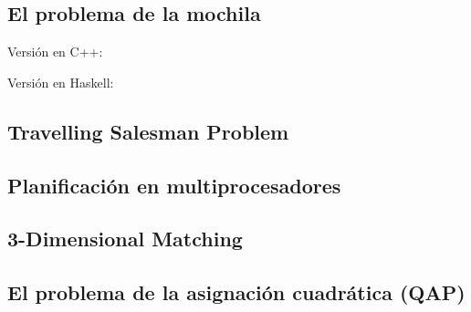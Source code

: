\documentclass[a4paper, 11pt]{article} %
\begin{document}
  \subsection{El problema de la mochila}
        Versión en C++:
        
        \small
  	\texttt{}
        \normalsize
        
        Versión en Haskell:
        
        \small
  	\texttt{}
        \normalsize
        
  \subsection{Travelling Salesman Problem}
        \small
  	\texttt{}
        \normalsize
  \subsection{Planificación en multiprocesadores}
        \small
  	\texttt{}
        \normalsize
  \subsection{3-Dimensional Matching}
        \small
  	\texttt{}
        \normalsize
  \subsection{El problema de la asignación cuadrática (QAP)}
        \small
        \normalsize

    
\end{document}
